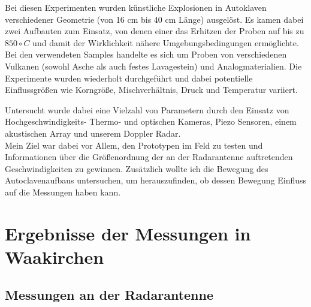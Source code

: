 \documentclass[12pt,a4paper]{scrartcl}
\begin{document}
Bei diesen Experimenten wurden künstliche Explosionen in Autoklaven \citep{Spieler:2004fk} verschiedener Geometrie (von 16 cm bis 40 cm Länge) ausgelöst. Es kamen dabei zwei Aufbauten zum Einsatz, von denen einer das Erhitzen der Proben auf bis zu $850\circ C$ und damit der Wirklichkeit nähere Umgebungsbedingungen ermöglichte. Bei den verwendeten Samples handelte es sich um Proben von verschiedenen Vulkanen (sowohl Asche als auch festes Lavagestein) und Analogmaterialien.
Die Experimente wurden wiederholt durchgeführt und dabei potentielle Einflussgrößen wie Korngröße, Mischverhältnis, Druck und Temperatur variiert.

Untersucht wurde dabei eine Vielzahl von Parametern durch den Einsatz von Hochgeschwindigkeits- Thermo- und optischen Kameras, Piezo Sensoren, einem akustischen Array und unserem Doppler Radar.\\

Mein Ziel war dabei vor Allem, den Prototypen im Feld zu testen und Informationen über die Größenordnung der an der Radarantenne auftretenden Geschwindigkeiten zu gewinnen. Zusätzlich wollte ich die Bewegung des Autoclavenaufbaus untersuchen, um herauszufinden, ob dessen Bewegung Einfluss auf die Messungen haben kann.



\section{Ergebnisse der Messungen in Waakirchen}



\subsection{Messungen an der Radarantenne}
\end{document}

